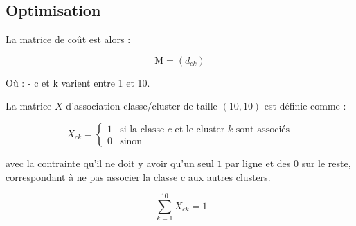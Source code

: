 \documentclass[
]{article}
\newenvironment{Shaded}{\begin{snugshade}}{\end{snugshade}}
\newcommand{\AttributeTok}[1]{\textcolor[rgb]{0.13,0.29,0.53}{#1}}
\newcommand{\DecValTok}[1]{\textcolor[rgb]{0.00,0.00,0.81}{#1}}
\newcommand{\FunctionTok}[1]{\textcolor[rgb]{0.13,0.29,0.53}{\textbf{#1}}}
\newcommand{\NormalTok}[1]{#1}
\newcommand{\OtherTok}[1]{\textcolor[rgb]{0.56,0.35,0.01}{#1}}
\newcommand{\SpecialCharTok}[1]{\textcolor[rgb]{0.81,0.36,0.00}{\textbf{#1}}}
\begin{document}
\begin{Shaded}
\end{Shaded}

\hypertarget{optimisation}{%
\subsection{Optimisation}\label{optimisation}}

La matrice de coût est alors :

\[
\text{M} = (d_{ck}) 
\]

Où : - c et k varient entre 1 et 10.

La matrice \(X\) d'association classe/cluster de taille \((10,10)\) est
définie comme :

\[
X_{ck} = 
\begin{cases} 
1 & \text{si la classe } c \text{ et le cluster } k \text{ sont associés} \\
0 & \text{sinon} 
\end{cases}
\]

avec la contrainte qu'il ne doit y avoir qu'un seul \(1\) par ligne et
des \(0\) sur le reste, correspondant à ne pas associer la classe c aux
autres clusters.

\[
\ \sum_{k=1}^{10} X_{ck} = 1
\]
\end{document}
